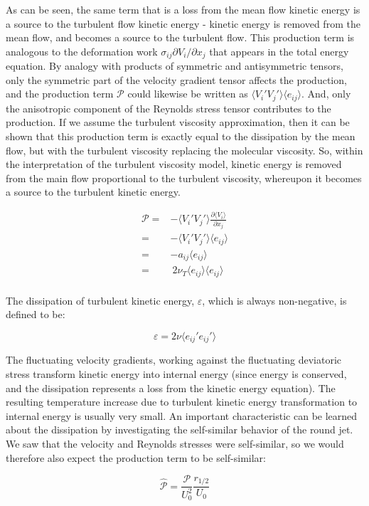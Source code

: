 \documentclass[10pt]{article}
\newcommand{\beq}{\begin{equation}}
\newcommand{\eeq}{\end{equation}}
\newcommand{\beqa}{\begin{equation}\begin{aligned}}
\newcommand{\eeqa}{\end{aligned}\end{equation}}
\newcommand{\la}{\langle}
\newcommand{\ra}{\rangle}
\begin{document}
\begin{flushleft}
As can be seen, the same term that is a loss from the mean flow kinetic energy is a source to the turbulent flow kinetic energy - kinetic energy is removed from the mean flow, and becomes a source to the turbulent flow. This production term is analogous to the deformation work \(\sigma_{ij}\partial V_i/\partial x_j\) that appears in the total energy equation. By analogy with products of symmetric and antisymmetric tensors, only the symmetric part of the velocity gradient tensor affects the production, and the production term \(\mathscr{P}\) could likewise be written as \(\la V_i'V_j'\ra\la e_{ij}\ra\). And, only the anisotropic component of the Reynolds stress tensor contributes to the production. If we assume the turbulent viscosity approximation, then it can be shown that this production term is exactly equal to the dissipation by the mean flow, but with the turbulent viscosity replacing the molecular viscosity. So, within the interpretation of the turbulent viscosity model, kinetic energy is removed from the main flow proportional to the turbulent viscosity, whereupon it becomes a source to the turbulent kinetic energy. 

\beqa
\mathscr{P}=&-\la V_i'V_j'\ra\frac{\partial \la V_i\ra}{\partial x_j}\\
=& -\la V_i'V_j'\ra\la e_{ij}\ra\\
=& -a_{ij}\la e_{ij}\ra\\
=& \ 2\nu_T\la e_{ij}\ra\la e_{ij}\ra\\
\eeqa

The dissipation of turbulent kinetic energy, \(\varepsilon\), which is always non-negative, is defined to be:

\beq
\varepsilon=2\nu\la e_{ij}'e_{ij}'\ra
\eeq

The fluctuating velocity gradients, working against the fluctuating deviatoric stress transform kinetic energy into internal energy (since energy is conserved, and the dissipation represents a loss from the kinetic energy equation). The resulting temperature increase due to turbulent kinetic energy transformation to internal energy is usually very small. An important characteristic can be learned about the dissipation by investigating the self-similar behavior of the round jet. We saw that the velocity and Reynolds stresses were self-similar, so we would therefore also expect the production term to be self-similar:

\beq
\hat{\mathscr{P}}=\frac{\mathscr{P}}{U_0^2}\frac{r_{1/2}}{U_0}
\eeq


\end{flushleft}
\end{document}
